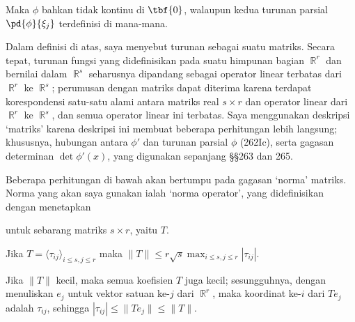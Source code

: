 {\noindent Maka $\phi$ bahkan tidak kontinu di $\tbf{0}$, walaupun kedua
turunan parsial $\pd{\phi}{\xi_j}$ terdefinisi di mana-mana.

 Dalam definisi di atas, saya menyebut turunan
sebagai suatu matriks.   Secara tepat, turunan fungsi yang didefinisikan
pada suatu himpunan bagian $\BbbR^r$ dan bernilai dalam $\BbbR^s$
seharusnya dipandang sebagai operator linear terbatas dari $\BbbR^r$ ke
$\BbbR^s$;  perumusan dengan matriks dapat diterima karena terdapat
korespondensi satu-satu alami antara matriks real $s\times r$ dan operator
linear dari $\BbbR^r$ ke $\BbbR^s$, dan semua operator linear ini terbatas.
Saya menggunakan deskripsi `matriks' karena deskripsi ini membuat beberapa
perhitungan lebih langsung; khususnya, hubungan antara $\phi'$ dan turunan
parsial $\phi$ (262Ic), serta gagasan determinan $\det\phi'(x)$, yang
digunakan sepanjang \S\S263 dan 265.
}%

 Beberapa perhitungan di bawah akan bertumpu
pada gagasan `norma' matriks.   Norma yang akan saya gunakan ialah
`norma operator', yang didefinisikan dengan menetapkan


\noindent untuk sebarang matriks $s\times r$, yaitu $T$.   

 Jika
$T=\langle\tau_{ij}\rangle_{i\le s,j\le r}$ maka
 $\|T\|\le r\sqrt{s}\max_{i\le s,j\le r}|\tau_{ij}|$.

{ Jika $\|T\|$ kecil, maka semua koefisien $T$ juga kecil; sesungguhnya,
dengan menuliskan $e_j$ untuk vektor satuan ke-$j$ dari $\BbbR^r$, maka
koordinat ke-$i$ dari $Te_j$ adalah $\tau_{ij}$, sehingga
$|\tau_{ij}|\le\|Te_j\|\le\|T\|$.}

